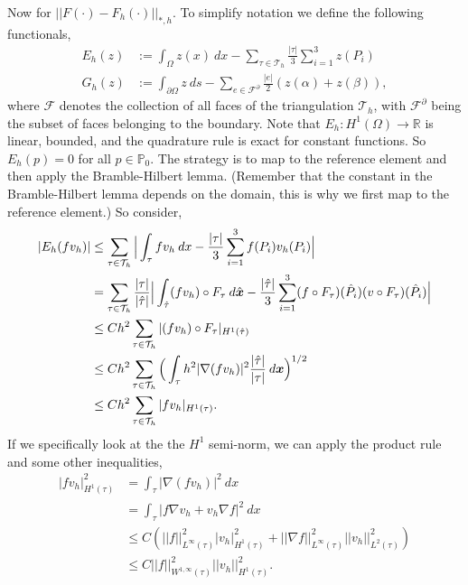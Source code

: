 \documentclass[11pt]{article}
\newcommand{\bs}{\boldsymbol}
\begin{document}
Now for $||F(\cdot) - F_h(\cdot)||_{*,h}$.
To simplify notation we define the following functionals,
\begin{align*}
    E_h(z) &:= \int_\Omega z(x) \: dx - \sum_{\tau \in \mathcal{T}_h} \frac{|\tau|}{3}\sum_{i=1}^3 z(P_i) \\
	G_h(z) &:= \int_{\partial \Omega} z \: ds - \sum_{e \in \mathcal{F}^\partial} \frac{|e|}{2} (z(\alpha) + z(\beta)),
\end{align*}
where $\mathcal{F}$ denotes the collection of all faces of the triangulation $\mathcal{T}_h$, with $\mathcal{F}^\partial$ being the subset of faces belonging to the boundary.
Note that $E_h : H^1(\Omega) \to \mathbb{R}$ is linear, bounded, and the quadrature rule is exact for constant functions.
So $E_h(p) = 0$ for all $p \in \mathbb{P}_0$. 
The strategy is to map to the reference element and then apply the Bramble-Hilbert lemma.
(Remember that the constant in the Bramble-Hilbert lemma depends on the domain, this is why we first map to the reference element.)
So consider,
\begin{align*}
    |E_h(f v_h)| &\leq \sum_{\tau \in \mathcal{T}_h} \Big| \int_\tau f v_h \: dx - \frac{|\tau|}{3} \sum_{i=1}^3 f(P_i) v_h(P_i) \Big| \\
	&= \sum_{\tau \in \mathcal{T}_h}  \frac{|\tau|}{|\Hat{\tau}|} \Big| \int_{\Hat{\tau}} (fv_h)\circ F_\tau \: d\Hat{\bs{x}}  - \frac{|\Hat{\tau}|}{3} \sum_{i=1}^3 (f\circ F_\tau)(\Hat{P}_i) (v\circ F_\tau)(\Hat{P}_i) \Big| \\
    &\leq Ch^2 \sum_{\tau \in \mathcal{T}_h} |(fv_h)\circ F_\tau|_{H^1(\Hat{\tau})} \\
	&\leq Ch^2 \sum_{\tau \in \mathcal{T}_h} \Big( \int_{\tau} h^2 |\nabla(f v_h)|^2 \frac{|\Hat{\tau}|}{|\tau|} \: d\bs{x} \Big)^{1/2} \\
    &\leq Ch^2 \sum_{\tau \in \mathcal{T}_h} |f v_h|_{H^1(\tau)}.
\end{align*}
If we specifically look at the the $H^1$ semi-norm, we can apply the product rule and some other inequalities,
\begin{align*}
    |f v_h|^2_{H^1(\tau)} &= \int_{\tau} |\nabla(f v_h)|^2 \: dx \\
    &= \int_{\tau} |f \nabla v_h + v_h \nabla f|^2 \: dx \\
    &\leq C (||f||^2_{L^\infty(\tau)} |v_h|^2_{H^1(\tau)} + ||\nabla f||^2_{L^\infty(\tau)} ||v_h||^2_{L^2(\tau)}) \\
    &\leq C ||f||^2_{W^{1,\infty}(\tau)} ||v_h||^2_{H^1(\tau)}.
\end{align*}
\end{document}
